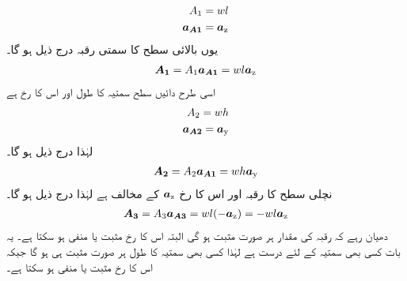 %
\begin{align*}
A_1&=wl\\
{{\boldsymbol{a_{A1}}}}&={\boldsymbol{a}}_{\textup{z}}
\end{align*}
یوں بالائی سطح کا سمتی رقبہ درج ذیل ہو گا۔
\begin{align}
{\ensuremath{{\boldsymbol{A_1}}}}=A_1 {{\boldsymbol{a_{A1}}}}= w l {\boldsymbol{a}}_{\textup{z}}
\end{align}
اسی طرح دائیں  سطح  سمتیہ  کا طول   اور اس کا رخ  ہے
\begin{align*}
A_2=wh\\
{{\boldsymbol{a_{A2}}}}={\boldsymbol{a}}_{\textup{y}}
\end{align*}
لہٰذا درج ذیل ہو گا۔
\begin{align}
{\ensuremath{{\boldsymbol{A_2}}}}=A_2 {{\boldsymbol{a_{A1}}}}=w h {\boldsymbol{a}}_{\textup{y}}
\end{align}
نچلی سطح کا رقبہ   اور اس کا رخ  ${\boldsymbol{a}}_{\textup{z}}$ کے مخالف  ہے لہٰذا درج ذیل ہو گا۔
\begin{align}
{\ensuremath{{\boldsymbol{A_3}}}}=A_3 {{\boldsymbol{a_{A3}}}}=wl (-{\boldsymbol{a}}_{\textup{z}})=-wl {\boldsymbol{a}}_{\textup{z}}
\end{align}
دھیان  رہے کہ رقبہ کی مقدار ہر صورت  مثبت ہو گی البتہ اس کا رخ مثبت یا منفی ہو سکتا ہے۔ یہ بات کسی بھی سمتیہ کے لئے درست ہے لہٰذا کسی بھی سمتیہ کا طول ہر صورت  مثبت ہی ہو گا جبکہ  اس کا رخ  مثبت یا منفی ہو سکتا  ہے۔


